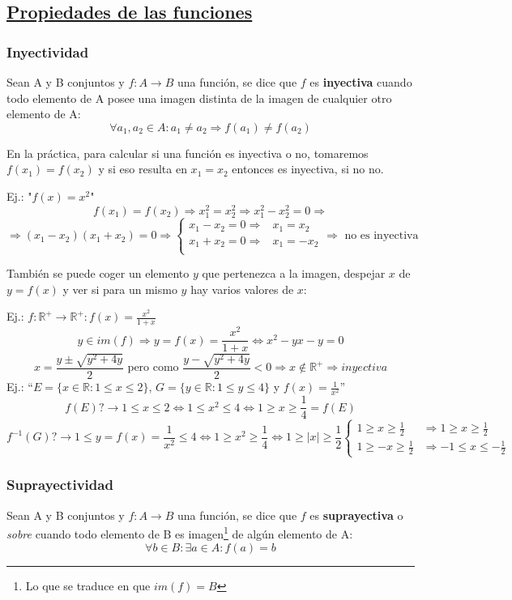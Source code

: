 \documentclass[10pt,a4paper,openright]{book}
\begin{document}
\subsection*{\underline{Propiedades de las funciones}}
\subsubsection*{Inyectividad}
Sean A y B conjuntos y $f: A \rightarrow B$ una función, se dice que $f$ es \textbf{inyectiva} cuando todo elemento de A posee una imagen distinta de la imagen de cualquier otro elemento de A:
$$\forall a_1, a_2 \in A : a_1 \neq a_2\Rightarrow f(a_1)\neq f(a_2)$$

En la práctica, para calcular si una función es inyectiva o no, tomaremos $f(x_1)=f(x_2)$ y si eso resulta en $x_1=x_2$ entonces es inyectiva, si no no.\par

Ej.:  "$f(x)=x^2$"
$$f(x_1)=f(x_2)\Rightarrow x_1^2=x_2^2\Rightarrow x_1^2-x_2^2=0 \Rightarrow$$
$$\Rightarrow (x_1-x_2)(x_1+x_2)=0 \Rightarrow
\begin{cases}
x_1-x_2=0 \Rightarrow & x_1=x_2 \\
x_1+x_2=0 \Rightarrow & x_1=-x_2 \\
\end{cases}
\Rightarrow \mbox{ no es inyectiva}$$

También se puede coger un elemento $y$ que pertenezca a la imagen, despejar $x$ de $y=f(x)$ y ver si para un mismo $y$ hay varios valores de $x$:\par
Ej.: $f: \mathbb R^+ \rightarrow \mathbb R^+ : f(x)=\frac{x^2}{1+x}$
$$y\in im(f)\Rightarrow y=f(x)=\frac{x^2}{1+x}\Leftrightarrow x^2-yx-y=0$$
$$x=\frac{y\pm \sqrt{y^2+4y}}{2}\mbox{ pero como }\frac{y-
 \sqrt{y^2+4y}}{2}<0\Rightarrow x\notin \mathbb R^+\Rightarrow inyectiva$$
Ej.: ``$E=\{x\in \mathbb R : 1\leq x\leq 2\}$, $G=\{y\in \mathbb R : 1\leq y\leq 4\}$ y $f(x)=\frac{1}{x^2}$''
$$f(E)?\rightarrow 1\leq x\leq 2\Leftrightarrow 1\leq x^2\leq 4\Leftrightarrow 1\geq x\geq \frac{1}{4}=f(E)$$
$$f^{-1}(G)?\rightarrow 1\leq y=f(x)=\frac{1}{x^2}\leq 4\Leftrightarrow 1\geq x^2\geq \frac{1}{4}\Leftrightarrow 1\geq |x|\geq \frac{1}{2} 
\begin{cases}
1\geq x\geq \frac{1}{2}& \Rightarrow 1\geq x\geq \frac{1}{2} \\
1\geq -x\geq \frac{1}{2}& \Rightarrow -1\leq x\leq -\frac{1}{2}
\end{cases}$$

\subsubsection*{Suprayectividad}
Sean A y B conjuntos y $f: A \rightarrow B$ una función, se dice que $f$ es \textbf{suprayectiva} o \textit{sobre} cuando todo elemento de B es imagen\footnote{Lo que se traduce en que $im(f)=B$} de algún elemento de A:
$$\forall b \in B : \exists a \in A : f(a)=b$$
\end{document}
